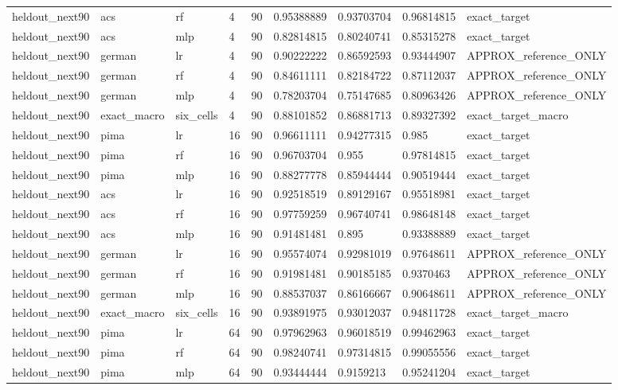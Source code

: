 \begin{tabular}{lllllllll}
heldout\_next90 & acs & rf & 4 & 90 & 0.95388889 & 0.93703704 & 0.96814815 & exact\_target \\
heldout\_next90 & acs & mlp & 4 & 90 & 0.82814815 & 0.80240741 & 0.85315278 & exact\_target \\
heldout\_next90 & german & lr & 4 & 90 & 0.90222222 & 0.86592593 & 0.93444907 & APPROX\_reference\_ONLY \\
heldout\_next90 & german & rf & 4 & 90 & 0.84611111 & 0.82184722 & 0.87112037 & APPROX\_reference\_ONLY \\
heldout\_next90 & german & mlp & 4 & 90 & 0.78203704 & 0.75147685 & 0.80963426 & APPROX\_reference\_ONLY \\
heldout\_next90 & exact\_macro & six\_cells & 4 & 90 & 0.88101852 & 0.86881713 & 0.89327392 & exact\_target\_macro \\
heldout\_next90 & pima & lr & 16 & 90 & 0.96611111 & 0.94277315 & 0.985 & exact\_target \\
heldout\_next90 & pima & rf & 16 & 90 & 0.96703704 & 0.955 & 0.97814815 & exact\_target \\
heldout\_next90 & pima & mlp & 16 & 90 & 0.88277778 & 0.85944444 & 0.90519444 & exact\_target \\
heldout\_next90 & acs & lr & 16 & 90 & 0.92518519 & 0.89129167 & 0.95518981 & exact\_target \\
heldout\_next90 & acs & rf & 16 & 90 & 0.97759259 & 0.96740741 & 0.98648148 & exact\_target \\
heldout\_next90 & acs & mlp & 16 & 90 & 0.91481481 & 0.895 & 0.93388889 & exact\_target \\
heldout\_next90 & german & lr & 16 & 90 & 0.95574074 & 0.92981019 & 0.97648611 & APPROX\_reference\_ONLY \\
heldout\_next90 & german & rf & 16 & 90 & 0.91981481 & 0.90185185 & 0.9370463 & APPROX\_reference\_ONLY \\
heldout\_next90 & german & mlp & 16 & 90 & 0.88537037 & 0.86166667 & 0.90648611 & APPROX\_reference\_ONLY \\
heldout\_next90 & exact\_macro & six\_cells & 16 & 90 & 0.93891975 & 0.93012037 & 0.94811728 & exact\_target\_macro \\
heldout\_next90 & pima & lr & 64 & 90 & 0.97962963 & 0.96018519 & 0.99462963 & exact\_target \\
heldout\_next90 & pima & rf & 64 & 90 & 0.98240741 & 0.97314815 & 0.99055556 & exact\_target \\
heldout\_next90 & pima & mlp & 64 & 90 & 0.93444444 & 0.9159213 & 0.95241204 & exact\_target \\

\end{tabular}
